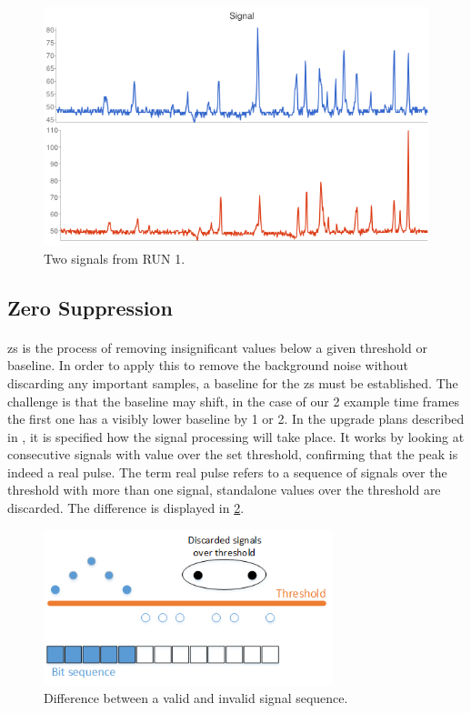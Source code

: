 \documentclass[a4paper, 12pt]{report}
\begin{document}
\begin{figure}[t]
	\centering
		\includegraphics[width=1.0\textwidth]{images/signal.png}
		\caption{Two signals from RUN 1.}
		\label{fig:signal}
\end{figure}

\subsection{Zero Suppression} 
\label{subsec:zs}

\paragraph{}
\gls{zs} is the process of removing insignificant values below a given threshold or baseline\cite{zerosuppression}.
In order to apply this to remove the background noise without discarding any important samples, a baseline for the \gls{zs} must be established.
The challenge is that the baseline may shift, in the case of our 2 example time frames the first one has a visibly lower baseline by 1 or 2.
In the upgrade plans described in \cite{tdr-015}, it is specified how the signal processing will take place.
It works by looking at consecutive signals with value over the set threshold, confirming that the peak is indeed a real pulse.
The term real pulse refers to a sequence of signals over the threshold with more than one signal, standalone values over the threshold are discarded.
The difference is displayed in \ref{fig:minseq}.

\begin{figure}[h!]
	\centering
		\includegraphics[width=0.75\textwidth]{images/minseq.png}
		\caption{Difference between a valid and invalid signal sequence.}
		\label{fig:minseq}
\end{figure}
\end{document}
